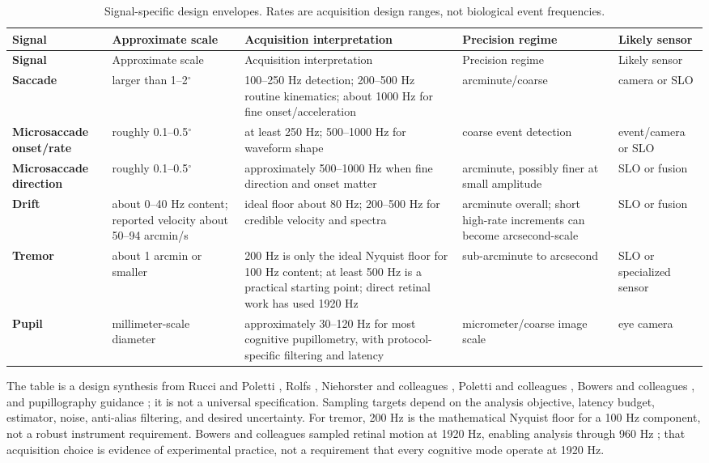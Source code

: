 \documentclass[11pt]{article}
\begin{document}
\begingroup
\small
\setlength{\tabcolsep}{3pt}
\begin{longtable}{>{\bfseries}p{} p{} p{}
                  p{} p{}}
\caption{Signal-specific design envelopes. Rates are acquisition design ranges, not biological
event frequencies.}\label{tab:signals}\\
\toprule
Signal & Approximate scale & Acquisition interpretation & Precision regime & Likely sensor\\
\midrule
\endfirsthead
\toprule
Signal & Approximate scale & Acquisition interpretation & Precision regime & Likely sensor\\
\midrule
\endhead
Saccade & larger than 1--2$^\circ$ & 100--250 Hz detection; 200--500 Hz routine kinematics;
about 1000 Hz for fine onset/acceleration &
arcminute/coarse & camera or SLO\\
Microsaccade onset/rate & roughly 0.1--0.5$^\circ$ & at least 250 Hz; 500--1000 Hz for waveform
shape & coarse event detection & event/camera or SLO\\
Microsaccade direction & roughly 0.1--0.5$^\circ$ & approximately 500--1000 Hz when fine direction
and onset matter & arcminute, possibly finer at small amplitude & SLO or fusion\\
Drift & about 0--40 Hz content; reported velocity about 50--94 arcmin/s & ideal floor about 80 Hz;
200--500 Hz for credible velocity and spectra &
arcminute overall; short high-rate increments can become arcsecond-scale & SLO or fusion\\
Tremor & about 1 arcmin or smaller & 200 Hz is only the ideal Nyquist floor for 100 Hz content;
at least 500 Hz is a practical starting point; direct retinal work has used 1920 Hz &
sub-arcminute to arcsecond & SLO or specialized sensor\\
Pupil & millimeter-scale diameter & approximately 30--120 Hz for most cognitive pupillometry,
with protocol-specific filtering and latency & micrometer/coarse image scale & eye camera\\
\bottomrule
\end{longtable}
\endgroup

The table is a design synthesis from Rucci and Poletti \cite{RucciPoletti2015}, Rolfs
\cite{Rolfs2009}, Niehorster and colleagues \cite{Niehorster2020}, Poletti and colleagues
\cite{Poletti2015}, Bowers and colleagues \cite{Bowers2019}, and pupillography guidance
\cite{Kelbsch2019}; it is not a universal specification. Sampling targets depend on the
analysis objective, latency budget, estimator, noise, anti-alias filtering, and desired uncertainty.
For tremor, 200 Hz is the mathematical Nyquist floor for a 100 Hz component, not a robust
instrument requirement. Bowers and colleagues sampled retinal motion at 1920 Hz, enabling analysis
through 960 Hz \cite{Bowers2019}; that acquisition choice is evidence of experimental practice, not
a requirement that every cognitive mode operate at 1920 Hz.
\end{document}
